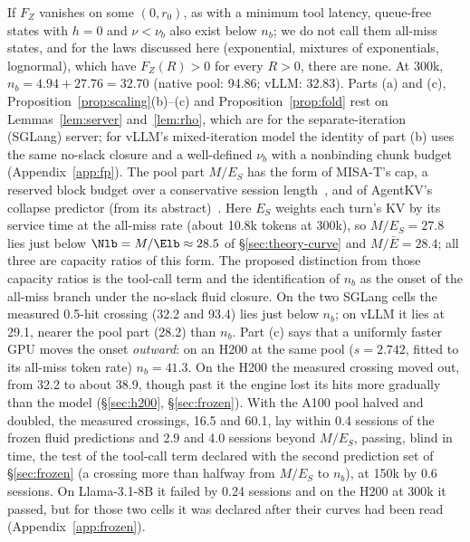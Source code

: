 \noindent If $F_Z$ vanishes on some $(0,r_0)$, as with a minimum tool latency, queue-free states with $h=0$ and $\nu<\nu_b$ also exist below $n_b$; we do not call them all-miss states, and for the laws discussed here (exponential, mixtures of exponentials, lognormal), which have $F_Z(R)>0$ for every $R>0$, there are none. At 300k, $n_b=4.94+27.76=32.70$ (native pool: 94.86; vLLM: 32.83). Parts (a) and (c), Proposition~\ref{prop:scaling}(b)--(c) and Proposition~\ref{prop:fold} rest on Lemmas~\ref{lem:server} and~\ref{lem:rho}, which are for the separate-iteration (SGLang) server; for vLLM's mixed-iteration model the identity of part (b) uses the same no-slack closure and a well-defined $\nu_b$ with a nonbinding chunk budget (Appendix~\ref{app:fp}). The pool part $M/E_S$ has the form of MISA-T's cap, a reserved block budget over a conservative session length~\citep{hong2026misat}, and of AgentKV's collapse predictor (from its abstract)~\citep{anon2026agentkv}. Here $E_S$ weights each turn's KV by its service time at the all-miss rate (about 10.8k tokens at 300k), so $M/E_S=27.8$ lies just below $\Nlb=M/\Elb\approx28.5$ of \S\ref{sec:theory-curve} and $M/\bar E=28.4$; all three are capacity ratios of this form. The proposed distinction from those capacity ratios is the tool-call term and the identification of $n_b$ as the onset of the all-miss branch under the no-slack fluid closure. On the two SGLang cells the measured 0.5-hit crossing (32.2 and 93.4) lies just below $n_b$; on vLLM it lies at 29.1, nearer the pool part (28.2) than $n_b$. Part (c) says that a uniformly faster GPU moves the onset \emph{outward}: on an H200 at the same pool ($s=2.742$, fitted to its all-miss token rate) $n_b=41.3$. On the H200 the measured crossing moved out, from 32.2 to about 38.9, though past it the engine lost its hits more gradually than the model (\S\ref{sec:h200}, \S\ref{sec:frozen}). With the A100 pool halved and doubled, the measured crossings, 16.5 and 60.1, lay within 0.4 sessions of the frozen fluid predictions and 2.9 and 4.0 sessions beyond $M/E_S$, passing, blind in time, the test of the tool-call term declared with the second prediction set of \S\ref{sec:frozen} (a crossing more than halfway from $M/E_S$ to $n_b$), at 150k by 0.6 sessions. On Llama-3.1-8B it failed by 0.24 sessions and on the H200 at 300k it passed, but for those two cells it was declared after their curves had been read (Appendix~\ref{app:frozen}).

